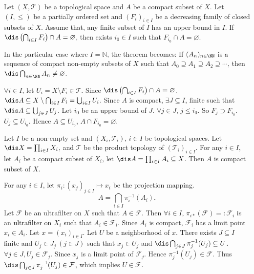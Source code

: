 \begin{theoremenv}
    Let $(X,\mathscr{T})$ be a topological space and $A$ be a compact subset of $X$. Let $(I,\le)$ be a partially ordered set and $(F_i)_{i\in I}$ be a decreasing family of closed subsets of $X$. Assume that, any finite subset of $I$ has an upper bound in $I$. If $\dis \left(\bigcap_{i\in I}F_i\right)\cap A=\varnothing$, then exists $i_0\in I$ such that $F_{i_0}\cap A=\varnothing$.
\end{theoremenv}
\begin{remark}
    In the particular case where $I=\mathbb{N}$, the theorem becomes: If $(A_n)_{n\in \NN}$ is a sequence of compact non-empty subsets of $X$ such that $A_0\supseteq A_1\supseteq A_2\supseteq\cdots$, then $\dis\bigcap_{n\in \NN}A_n\neq\varnothing$. 
\end{remark}
\begin{proofenv}
    $\forall i\in I$, let $U_i=X\setminus F_i\in \mathscr{T}$. Since $\dis \left(\bigcap_{i\in I}F_i\right)\cap A=\varnothing$. $\dis A\subseteq X\setminus \bigcap_{i\in I}F_i=\bigcup_{i\in I}U_i$.
    Since $A$ is compact, $\exists J\subseteq I$, finite such that $\dis A\subseteq \bigcup_{j\in J}U_j$. Let $i_0$ be an upper bound of $J$. $\forall j\in J$, $j\le i_0$. So $F_j\supset F_{i_0}$. $U_j\subseteq U_{i_0}$. Hence $A\subseteq U_{i_0}$, $A\cap F_{i_0}=\varnothing$.
\end{proofenv}
\begin{theoremenv}[Tychonoff]
    Let $I$ be a non-empty set and $(X_i,\mathscr{T}_i)$, $i\in I$ be topological spaces. Let $\dis X=\prod_{i\in I}X_i$, and $\mathscr{T}$ be the product topology of $\left(\mathscr{T}_i\right)_{i\in I}$. For any $i\in I$, let $A_i$ be a compact subset of $X_i$, let $\dis A=\prod_{i\in I}A_i \subseteq X$. Then $A$ is compact subset of $X$.
    
\end{theoremenv}
\begin{proofenv}
    For any $i\in I$, let $\pi_i: (x_j)_{j\in I}\longmapsto x_i$ be the projection mapping. 
    $$A=\bigcap_{i\in I}\pi^{-1}_{i}(A_i).$$
    Let $\mathcal{F}$ be an ultrafilter on $X$ such that $A\in \mathcal{F}$. Then $\forall i\in I$, $\pi_{i*}(\mathcal{F})=:\mathcal{F}_i$ is an ultrafilter on $X_i$ such that $A_i\in \mathcal{F}_i$. Since $A_i$ is compact, $\mathcal{F}_i$ has a limit point $x_i\in A_i$. Let $x=(x_i)_{i\in I}$. Let $U$ be a neighborhood of $x$. There exists $J\subseteq I$ finite and $U_j\in J_j\ (j\in J)$ such that $x_j\in U_j$ and $\dis \bigcap_{j\in J}\pi_{j}^{-1}(U_j)\subseteq U$. $\forall j\in J, U_j\in \mathcal{F}_j$. Since $x_j$ is a limit point of $\mathcal{F}_j$. Hence $\pi^{-1}_j(U_j)\in \mathcal{F}$. Thus $\dis \bigcap_{j\in J}\pi_{j}^{-1}(U_j)\in \mathcal{F}$, which implies $U\in \mathcal{F}$. 
\end{proofenv}

